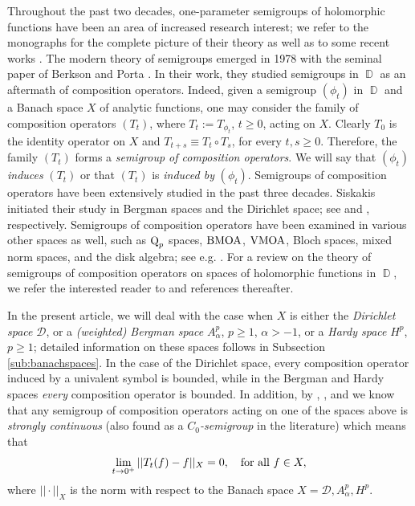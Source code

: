 \documentclass[11pt]{amsart}
\numberwithin{equation}{section}
\theoremstyle{definition}
\DeclareMathOperator{\D}{\mathbb{D}}
\begin{document}
	Throughout the past two decades, one-parameter semigroups of holomorphic functions have been an area of increased research interest; we refer to the monographs \cite{Booksem, shoikhet} for the complete picture of their theory as well as to some recent works \cite{BZ, contreras_gumenyuk, gumenyuk_kourou_roth}. The modern theory of semigroups emerged in 1978 with the seminal paper of Berkson and Porta \cite{berksonporta}. In their work, they studied semigroups in $\D$ as an aftermath of composition operators. Indeed, given a semigroup $(\phi_t)$ in $\D$ and a Banach space $X$ of analytic functions, one may consider the family of composition operators $(T_t)$, where $T_t:=T_{\phi_t}$, $t\ge0$, acting on $X$. Clearly $T_0$ is the identity operator on $X$ and $T_{t+s}\equiv T_t\circ T_s$, for every $t,s\ge0$. Therefore, the family $(T_t)$ forms a \textit{semigroup of composition operators}. We will say that $(\phi_t)$ \textit{induces} $(T_t)$ or that $(T_t)$ is \textit{induced by} $(\phi_t)$. Semigroups of composition operators have been extensively studied in the past three decades. Siskakis initiated their study in Bergman spaces and the Dirichlet space; see \cite{Siskakis-Bergman} and \cite{Siskakis-Dirichlet}, respectively. Semigroups of composition operators have been examined in various other spaces as well, such as $\textup{Q}_p$ spaces, $\textup{BMOA}$, $\textup{VMOA}$, Bloch spaces, mixed norm spaces, and the disk algebra; see e.g. \cite{contreras_2019, avicou_2016, blasco_etal_2008, chalmoukis_daskalogiannis, CDM-Algebra, contreras_gomez, elin_2018, Qian_Wu_Wulan}. For a review on the theory of semigroups of composition operators on spaces of holomorphic functions in $\D$, we refer the interested reader to \cite{siskakis_review} and references thereafter. 
	
	In the present article, we will deal with the case when $X$ is either the \textit{Dirichlet space} $\mathcal{D}$, or a \textit{(weighted) Bergman space} $A_\alpha^p$, $p\ge1$, $\alpha>-1$, or a \textit{Hardy space} $H^p$, $p\ge1$; detailed information on these spaces follows in Subsection \ref{sub:banachspaces}. In the case of the Dirichlet space, every composition operator induced by a univalent symbol is bounded, while in the Bergman and Hardy spaces \textit{every} composition operator is bounded. In addition, by \cite[Theorem 3.4]{berksonporta}, \cite[Theorem 1]{Siskakis-Bergman}, and \cite[Theorem 1]{Siskakis-Dirichlet} we know that any semigroup of composition operators acting on one of the spaces above is \textit{strongly continuous} (also found as a $C_0$\textit{-semigroup} in the literature) which means that 
	$$\lim\limits_{t\to0^+}||T_t(f)-f||_X=0, \quad\textup{for all }f\in X,$$
	where $||\cdot||_X$ is the norm with respect to the Banach space $X=\mathcal{D},A_\alpha^p,H^p$.
	
\end{document}
